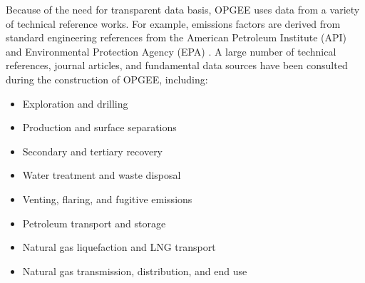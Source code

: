 \documentclass[11pt]{report}
\begin{document}
Because of the need for transparent data basis, OPGEE uses data from a variety of technical reference works. For example, emissions factors are derived from standard engineering references from the American Petroleum Institute (API) and Environmental Protection Agency (EPA) \cite{EPA1995a, Shires2004}. A large number of technical references, journal articles, and fundamental data sources have been consulted during the construction of OPGEE, including: 
\begin{itemize}
\item Exploration and drilling \cite{Shires2004, Azar2007, Devereux1998, Gidley1989, Lapeyrouse2002, Mitchell2006, Mitchell2011, Wilson1999}
\item Production and surface separations \cite{Shires2004,  API1991, API1993a, API1995a, API1996b, API1998a, API2003, API2006, API2008a, API2008b, API2009a, API2009b, API2009c, API2009d, Arnold2007, Chilingarian1987, Chilingarian1989, Cholet2000, Clegg2007, Fanchi2007, GPSA2004, Holstein2007a, Holstein2007b, Leffler2006, Manning1991, Manning1995, Stewart2008, Stewart2009, Stewart2011, Takacs1993, Takacs2003}
\item Secondary and tertiary recovery \cite{Craig1993, Jarrell2002, Prats1985, Rose1989, Warner2007, Green1998}
\item Water treatment and waste disposal \cite{Wilson1999, Manning1995, Stewart2011, Khatib2002, Neff2007, Reed1996, Veil2004}
\item Venting, flaring, and fugitive emissions \cite{API1991, API1993a, API1995a, API1996b, API1998a, API1998b, API1998c, API2003, API2006, API2008a, API2008b, API2008c, API2009a, API1993b, API1995a, API2009e}
\item Petroleum transport and storage \cite{API2006, GPSA2004, API1993b, API1995b, API1997, API2009a, Mcallister2009, Miesner2006, Szilas1985}
\item Natural gas liquefaction and LNG transport \cite{RodaStuart2018, Nie2020, Abrahams2015}
\item Natural gas transmission, distribution, and end use \cite{DiLullo2020, Zimmerle2015, Fischer2018}

\end{itemize}

\clearpage

\end{document}
